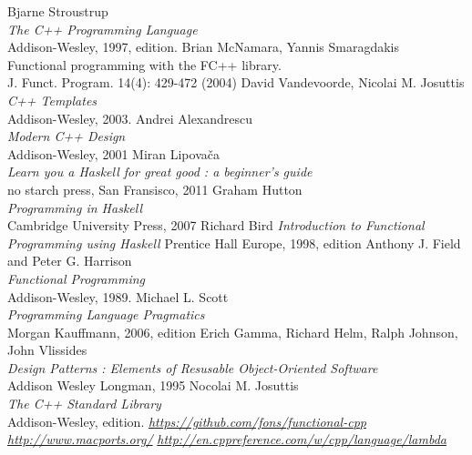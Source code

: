 \documentclass[12pt,fleqn]{article}
\begin{document}
\begin{thebibliography}{99}
Bjarne Stroustrup \\
{\em The C++ Programming Language} \\
Addison-Wesley, 1997,  edition.
Brian McNamara, Yannis Smaragdakis  \\
Functional programming with the FC++ library. \\
J. Funct. Program. 14(4): 429-472 (2004)
David Vandevoorde, Nicolai M. Josuttis \\
{\em C++ Templates} \\
Addison-Wesley, 2003.
%
Andrei Alexandrescu \\
{\em Modern C++ Design} \\
Addison-Wesley, 2001
%
 Miran Lipova\v{c}a\\
{\em Learn you a Haskell for great good : a beginner's guide}\\
no starch press, San Fransisco, 2011
Graham Hutton \\
{\em Programming in Haskell} \\
Cambridge University Press, 2007
Richard Bird
{\em Introduction to Functional Programming using Haskell}
Prentice Hall Europe, 1998,  edition
Anthony J. Field and Peter G. Harrison \\
{\em Functional Programming} \\
Addison-Wesley, 1989.
Michael L. Scott \\
{\em Programming Language Pragmatics} \\
Morgan Kauffmann, 2006,  edition
Erich Gamma, Richard Helm, Ralph Johnson, John Vlissides \\
{\em Design Patterns : Elements of Resusable Object-Oriented Software} \\
Addison Wesley Longman, 1995
Nocolai M. Josuttis \\
{\em The C++ Standard Library}\\
Addison-Wesley,  edition.
\underline{\em https://github.com/fons/functional-cpp}
\underline {\em http://www.macports.org/}
\underline{\em http://en.cppreference.com/w/cpp/language/lambda}

\end{thebibliography}
\end{document}
